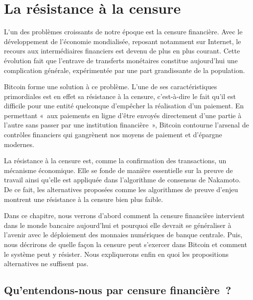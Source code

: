 
\chapter{La résistance à la censure}
\label{ch:censure}
\label{enotezch:9}

\lettrine[]{L}'un des problèmes croissants de notre époque est la censure financière. Avec le développement de l'économie mondialisée, reposant notamment sur Internet, le recours aux intermédiaires financiers est devenu de plus en plus courant. Cette évolution fait que l'entrave de transferts monétaires constitue aujourd'hui une complication générale, expérimentée par une part grandissante de la population.

Bitcoin forme une solution à ce problème. L'une de ses caractéristiques primordiales est en effet sa résistance à la censure, c'est-à-dire le fait qu'il est difficile pour une entité quelconque d'empêcher la réalisation d'un paiement. En permettant «~aux paiements en ligne d'être envoyés directement d'une partie à l'autre sans passer par une institution financière~», Bitcoin contourne l'arsenal de contrôles financiers qui gangrènent nos moyens de paiement et d'épargne modernes.

La résistance à la censure est, comme la confirmation des transactions, un mécanisme économique. Elle se fonde de manière essentielle sur la preuve de travail ainsi qu'elle est appliquée dans l'algorithme de consensus de Nakamoto. De ce fait, les alternatives proposées comme les algorithmes de preuve d'enjeu montrent une résistance à la censure bien plus faible.

Dans ce chapitre, nous verrons d'abord comment la censure financière intervient dans le monde bancaire aujourd'hui et pourquoi elle devrait se généraliser à l'avenir avec le déploiement des monnaies numériques de banque centrale. Puis, nous décrirons de quelle façon la censure peut s'exercer dans Bitcoin et comment le système peut y résister. Nous expliquerons enfin en quoi les propositions alternatives ne suffisent pas.

\section*{Qu'entendons-nous par censure financière~?}

